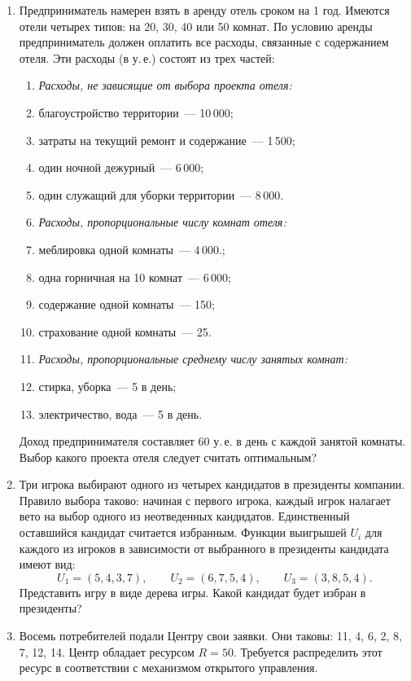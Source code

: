 \documentclass[a4paper,12pt]{extarticle}
\begin{document}
\begin{enumerate}
\item 
  Предприниматель намерен взять в аренду отель сроком на 1 год. 
  Имеются отели четырех типов: на 20, 30, 40 или 50 комнат. По условию аренды предприниматель должен оплатить все расходы, связанные с содержанием отеля. 
  Эти расходы (в у.\,е.) состоят из трех частей:
  \begin{enumerate}
    \item[] \textit{Расходы, не зависящие от выбора проекта отеля:}
      \item благоустройство территории~--- 10\,000;
      \item затраты на текущий ремонт и содержание~--- 1\,500;
      \item один ночной дежурный~--- 6\,000;
      \item один служащий для уборки территории~--- 8\,000.
    \item[] \textit{Расходы, пропорциональные числу комнат отеля:}
      \item меблировка одной комнаты~---  4\,000.;
      \item одна горничная на 10 комнат~---  6\,000;
      \item содержание одной комнаты~---  150;
      \item страхование одной комнаты~---  25.
    \item[] \textit{Расходы, пропорциональные среднему числу занятых комнат:}
      \item стирка, уборка~--- 5 в день;
      \item электричество, вода~--- 5 в день.
  \end{enumerate}
  Доход предпринимателя составляет 60 у.\,е. в день с каждой занятой комнаты. 
  Выбор какого проекта отеля следует считать оптимальным?  

  \item 
  Три игрока выбирают одного из четырех кандидатов в президенты компании. 
  Правило выбора таково:
  начиная с первого игрока, каждый игрок налагает вето на выбор одного из неотведенных кандидатов. 
  Единственный оставшийся кандидат считается избранным. 
  Функции выигрышей $U_i$ для каждого из игроков в зависимости от выбранного в президенты кандидата имеют вид:
  $$
    U_1 = (5,4,3,7),\qquad 
    U_2 = (6,7,5,4),\qquad
    U_3 = (3,8,5,4).
  $$
  Представить игру в виде дерева игры. Какой кандидат будет избран в президенты?  

  \item Восемь потребителей подали Центру свои заявки. Они таковы:
  11, 4, 6, 2, 8, 7, 12, 14. Центр обладает ресурсом $R = 50$. 
  Требуется распределить этот ресурс в соответствии с механизмом открытого управления. 


\end{enumerate}
\end{document}
